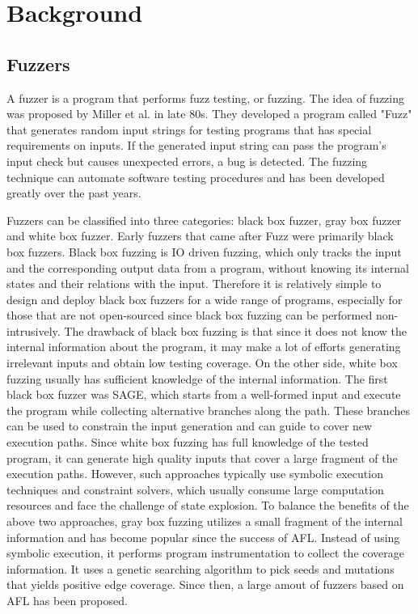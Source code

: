 \chapter{\label{cha:background}Background}


\section{Fuzzers}
A fuzzer is a program that performs fuzz testing, or fuzzing. The idea of fuzzing was proposed by Miller et al. \cite{millerFuzzer} in late 80s. They developed a program called "Fuzz" that generates random input strings for testing programs that has special requirements on inputs. If the generated input string can pass the program's input check but causes unexpected errors, a bug is detected. The fuzzing technique can automate software testing procedures and has been developed greatly over the past years.

Fuzzers can be classified into three categories: black box fuzzer, gray box fuzzer and white box fuzzer. Early fuzzers that came after Fuzz were primarily black box fuzzers. Black box fuzzing is IO driven fuzzing, which only tracks the input and the corresponding output data from a program, without knowing its internal states and their relations with the input. Therefore it is relatively simple to design and deploy black box fuzzers for a wide range of programs, especially for those that are not open-sourced since black box fuzzing can be performed non-intrusively. The drawback of black box fuzzing is that since it does not know the internal information about the program, it may make a lot of efforts generating irrelevant inputs and obtain low testing coverage. On the other side, white box fuzzing usually has sufficient knowledge of the internal information. The first black box fuzzer was SAGE\cite{sage}, which starts from a well-formed input and execute the program while collecting alternative branches along the path. These branches can be used to constrain the input generation and can guide to cover new execution paths. Since white box fuzzing has full knowledge of the tested program, it can generate high quality inputs that cover a large fragment of the execution paths. However, such approaches typically use symbolic execution techniques and constraint solvers, which usually consume large computation resources and face the challenge of state explosion. To balance the benefits of the above two approaches, gray box fuzzing utilizes a small fragment of the internal information and has become popular since the success of AFL\cite{afl}. Instead of using symbolic execution, it performs program instrumentation to collect the coverage information. It uses a genetic searching algorithm to pick seeds and mutations that yields positive edge coverage. Since then, a large amout of fuzzers based on AFL has been proposed\cite{TriforceAFL, kAFL, Driller, CollAFL}.


